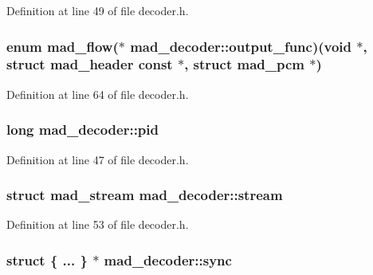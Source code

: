Definition at line 49 of file decoder.\+h.

\subsubsection[{\texorpdfstring{output\+\_\+func}{output_func}}]{\setlength{\rightskip}{0pt plus 5cm}enum {\bf mad\+\_\+flow}($\ast$ mad\+\_\+decoder\+::output\+\_\+func)({\bf void} $\ast$, struct {\bf mad\+\_\+header} {\bf const} $\ast$, struct {\bf mad\+\_\+pcm} $\ast$)}\hypertarget{structmad__decoder_a48289cb5be13e08b11f880a87d3990ef}{}\label{structmad__decoder_a48289cb5be13e08b11f880a87d3990ef}


Definition at line 64 of file decoder.\+h.

\subsubsection[{\texorpdfstring{pid}{pid}}]{\setlength{\rightskip}{0pt plus 5cm}long mad\+\_\+decoder\+::pid}\hypertarget{structmad__decoder_a72d64fb82706560651ec3ee6cbf500d2}{}\label{structmad__decoder_a72d64fb82706560651ec3ee6cbf500d2}


Definition at line 47 of file decoder.\+h.

\subsubsection[{\texorpdfstring{stream}{stream}}]{\setlength{\rightskip}{0pt plus 5cm}struct {\bf mad\+\_\+stream} mad\+\_\+decoder\+::stream}\hypertarget{structmad__decoder_a4d0b89b70cb6bbc3172a222ba9c751d1}{}\label{structmad__decoder_a4d0b89b70cb6bbc3172a222ba9c751d1}


Definition at line 53 of file decoder.\+h.

\subsubsection[{\texorpdfstring{sync}{sync}}]{\setlength{\rightskip}{0pt plus 5cm}struct \{ ... \}  $\ast$ mad\+\_\+decoder\+::sync}\hypertarget{structmad__decoder_a6359ac37316b99762cf64a4a1be8e3ea}{}\label{structmad__decoder_a6359ac37316b99762cf64a4a1be8e3ea}
